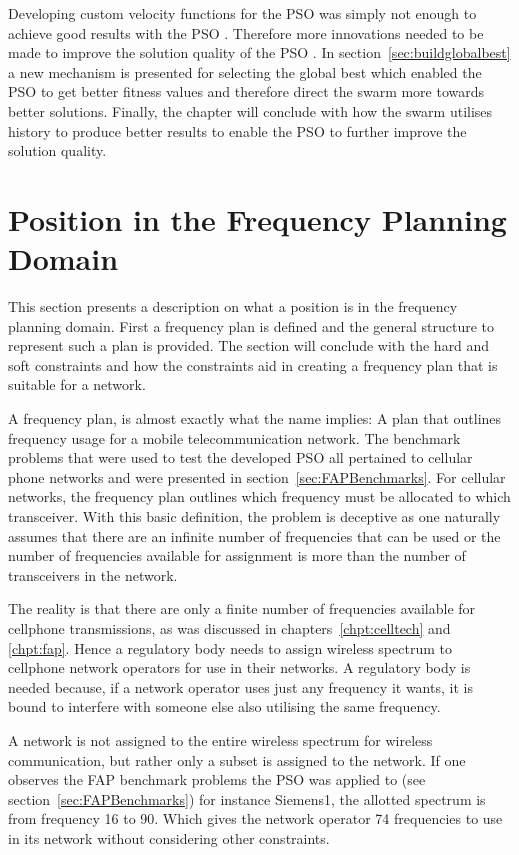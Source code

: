 Developing custom velocity functions for the \gls{PSO} was simply not enough to achieve good results with the \gls{PSO} . Therefore more innovations needed to be made to improve the solution quality of the \gls{PSO} . In section~\ref{sec:buildglobalbest} a new mechanism is presented for selecting the global best which enabled the \gls{PSO} to get better fitness values and therefore direct the swarm more towards better solutions. Finally, the chapter will conclude with how the swarm utilises history to produce better results to enable the \gls{PSO} to further improve the solution quality.
\section{Position in the Frequency Planning Domain}
This section presents a description on what a position is in the frequency planning domain. First a frequency plan is defined and the general structure to represent such a plan is provided. The section will conclude with the hard and soft constraints and how the constraints aid in creating a frequency plan that is suitable for a network.

A frequency plan, is almost exactly what the name implies: A plan that outlines frequency usage for a mobile telecommunication network. The benchmark problems that were used to test the developed \gls{PSO} all pertained to cellular phone networks and were presented in section~\ref{sec:FAPBenchmarks}. For cellular networks, the frequency plan outlines which frequency must be allocated to which transceiver. With this basic definition, the problem is deceptive as one naturally assumes that there are an infinite number of frequencies that can be used or the number of frequencies available for assignment is more than the number of transceivers in the network. 

The reality is that there are only a finite number of frequencies available for cellphone transmissions, as was discussed in chapters~\ref{chpt:celltech} and \ref{chpt:fap}. Hence a regulatory body needs to assign wireless spectrum to cellphone network operators for use in their networks. A regulatory body is needed because, if a network operator uses just any frequency it wants, it is bound to interfere with someone else also utilising the same frequency.

A network is not assigned to the entire wireless spectrum for wireless communication, but rather only a subset is assigned to the network. If one observes the \gls{FAP} benchmark problems the \gls{PSO} was applied to (see section~\ref{sec:FAPBenchmarks}) for instance Siemens1, the allotted spectrum is from frequency 16 to 90. Which gives the network operator 74 frequencies to use in its network without considering other constraints. 

